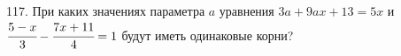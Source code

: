 117. При каких значениях параметра $a$ уравнения $3a + 9ax + 13 = 5x$ и $\cfrac{5-x}{3}-\cfrac{7x+11}{4}=1$ будут иметь одинаковые корни?
\newpage
